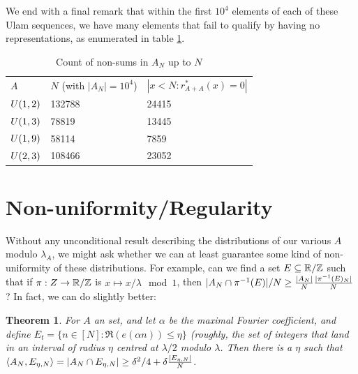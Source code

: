 \documentclass{report}
\newtheorem{theorem}{Theorem}[section]
\newtheorem{definition}[theorem]{Definition}
\theoremstyle{remark}
\numberwithin{equation}{section}
\begin{document}
We end with a final remark that within the first $10^4$ elements of
each of these Ulam sequences, we have many elements that fail to
qualify by having no representations, as enumerated in table
\ref{tab:nonsums_count}.  

\begin{table}
\caption{Count of non-sums in $A_N$ up to
  $N$}\label{tab:nonsums_count}
\centering
\begin{tabular}{lll}
$A$ & $N$ (with $|A_N| = 10^4$) & $|x < N : r^*_{A+A}(x) = 0|$\\
$U(1,2)$ & 132788 & 24415\\
$U(1,3)$ & 78819 & 13445\\
$U(1,9)$ & 58114 & 7859\\
$U(2,3)$ & 108466 & 23052
\end{tabular}
\end{table}

\section{Non-uniformity/Regularity}


Without any unconditional result describing the distributions of our
various $A$ modulo $\lambda_A$, we might ask whether we can at least
guarantee some kind of non-uniformity of these distributions.  For
example, can we find a set $E \subseteq \mathbb{R}/\mathbb{Z}$ such that if
$\pi : Z \to \mathbb{R}/\mathbb{Z}$ is $x \mapsto x/\lambda \mod{1}$, then
$|A_N \cap \pi^{-1}(E)|/N \geq
\frac{|A_N|}{N}\frac{|\pi^{-1}(E)_N|}{N}$?  In fact, we can do slightly
better:

\begin{theorem}\label{thm:regularity}
  For $A$ an \relevant set, and let $\alpha$ be the maximal Fourier
  coefficient, and define
  $E_{t} = \{n \in [N] : \Re(e(\alpha n)) \leq \eta\}$ (roughly, the
  set of integers that land in an interval of radius $\eta$ centred at
  $\lambda/2$ modulo $\lambda$.  Then there is a $\eta$ such that
  $\left<A_N, E_{\eta,N}\right> = |A_N \cap E_{\eta,N}| \geq \delta^2/4 +
  \delta \frac{|E_{\eta,N}|}{N}$.
\end{theorem}
\end{document}
